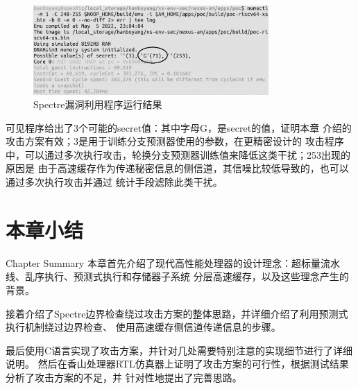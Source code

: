 \begin{figure}[ht]
	\centering
	\includegraphics[width=0.8\textwidth]{figs/spectre-result.png}
	\caption{Spectre漏洞利用程序运行结果}
	\label{fig:spectre-result}
\end{figure}

可见程序给出了3个可能的secret值：其中字母G，是secret的值，证明本章
介绍的攻击方案有效；3是用于训练分支预测器使用的参数，在更精密设计的
攻击程序中，可以通过多次执行攻击，轮换分支预测器训练值来降低这类干扰；253出现的原因是
由于高速缓存作为传递秘密信息的侧信道，其信噪比较低导致的，也可以通过多次执行攻击并通过
统计手段滤除此类干扰。


\section{本章小结}{Chapter Summary}
本章首先介绍了现代高性能处理器的设计理念：超标量流水线、乱序执行、预测式执行和存储器子系统
分层高速缓存，以及这些理念产生的背景。

接着介绍了Spectre边界检查绕过攻击方案的整体思路，并详细介绍了利用预测式执行机制绕过边界检查、
使用高速缓存侧信道传递信息的步骤。

最后使用C语言实现了攻击方案，并针对几处需要特别注意的实现细节进行了详细说明。
然后在香山处理器RTL仿真器上证明了攻击方案的可行性，根据测试结果分析了攻击方案的不足，并
针对性地提出了完善思路。


\newpage
